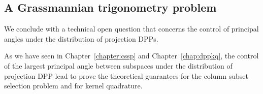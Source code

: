 \documentclass[twoside,11pt]{book}
\numberwithin{theorem}{chapter}
\numberwithin{definition}{chapter}
\numberwithin{proposition}{chapter}
\numberwithin{corollary}{chapter}
\numberwithin{example}{chapter}
\numberwithin{lemma}{chapter}
\numberwithin{assumption}{chapter}
\numberwithin{equation}{chapter}
\numberwithin{figure}{chapter}
\begin{document}







 




\subsection{A Grassmannian trigonometry problem}\label{sec:conclusion_trigonometry_problem}
We conclude with a technical open question that concerns the control of principal angles under the distribution of projection DPPs.

As we have seen in Chapter~\ref{chapter:cssp} and Chapter~\ref{chap:dppkq}, the control of the largest principal angle between subspaces under the distribution of projection DPP lead to prove the theoretical guarantees for the column subset selection problem and for kernel quadrature. 
\end{document}

